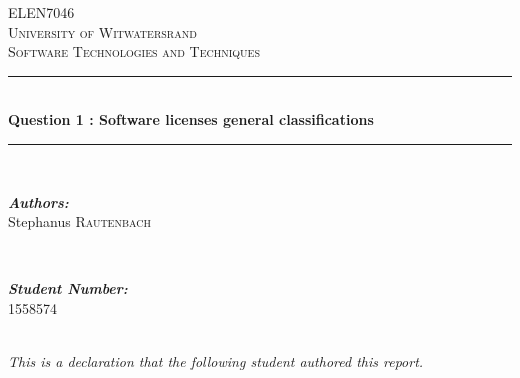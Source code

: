 \documentclass[10pt, onecolumn]{witseiepaper}
\begin{document}
\begin{titlepage}
	
	\newcommand{\HRule}{\rule{\linewidth}{0.5mm}} 
	
	\begin{center}
		
		\textsc{\LARGE ELEN7046}\\[0.5cm]
		
		\textsc{\Large University of Witwatersrand}\\[0.25cm]
		
		\textsc{\large Software Technologies and Techniques}\\[0.5cm]
		
		\HRule \\[0.4cm]
		{ \huge \bfseries Question 1 : Software licenses general classifications }\\[0.25cm]
		
		\HRule \\[1.25cm]
		\begin{minipage}
			{0.4
				\textwidth} 
			\begin{flushleft}
				\large \emph{\textbf{Authors:}}\\
				Stephanus  \textsc{Rautenbach} \\
			\end{flushleft}
		\end{minipage}
		~ 
		\begin{minipage}
			{0.4
				\textwidth} 
			\begin{flushright}
				\large \emph{\textbf{Student Number:}} \\
				1558574  \\
			\end{flushright}
		\end{minipage}
		
		\begin{minipage}
			{1	\textwidth} 
			\begin{flushright}
				\center\large{\textit{\\This is a declaration that the following student authored this report.}} \\
			\end{flushright}
		\end{minipage}\\[2cm]
		

\end{center}
\end{titlepage}
\end{document}
